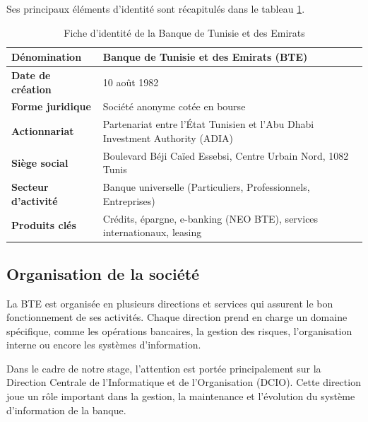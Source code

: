         Ses principaux éléments d'identité sont récapitulés dans le tableau
        \ref{tab:bte_fiche}.

        \begin{table}[H]
        \centering
        \begin{tabular}{|m{4.5cm}|m{8.5cm}|}
        \hline
        \textbf{Dénomination} & Banque de Tunisie et des Emirats (BTE) \\
        \hline
        \textbf{Date de création} & 10 août 1982 \\
        \hline
        \textbf{Forme juridique} & Société anonyme cotée en bourse \\
        \hline
        \textbf{Actionnariat} & Partenariat entre l'État Tunisien et l'Abu Dhabi
                                Investment Authority (ADIA) \\
        \hline
        \textbf{Siège social} & Boulevard Béji Caïed Essebsi, Centre Urbain Nord,
                                1082 Tunis \\
        \hline
        \textbf{Secteur d'activité} & Banque universelle (Particuliers, Professionnels,
                                      Entreprises) \\
        \hline
        \textbf{Produits clés} & Crédits, épargne, e-banking (NEO BTE), services
                                 internationaux, leasing \\
        \hline
        \end{tabular}
        \caption{Fiche d'identité de la Banque de Tunisie et des Emirats}
        \label{tab:bte_fiche}
        \end{table}

    \subsection{Organisation de la société}

        La BTE est organisée en plusieurs directions et services qui assurent le bon
        fonctionnement de ses activités. Chaque direction prend en charge un domaine
        spécifique, comme les opérations bancaires, la gestion des risques, l'organisation
        interne ou encore les systèmes d'information.

        Dans le cadre de notre stage, l'attention est portée principalement sur la
        Direction Centrale de l'Informatique et de l'Organisation (DCIO). Cette direction
        joue un rôle important dans la gestion, la maintenance et l'évolution du système
        d'information de la banque.


